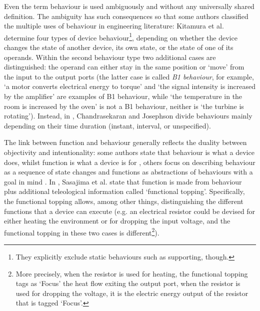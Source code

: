 \documentclass[sw]{iosart2x}
\newcommand{\firstTimeKeyWord}[1]{\textit{#1}}
\newcommand{\quotes}[1]{`#1'}
\newcommand{\TODO}[1]{{\color{red} #1
}}
\newcommand{\TODOinline}[1]{{\color{red} #1
}}
\newcommand{\myComment}[1]{{\unskip \ignorespaces}}
\begin{document}
Even the term behaviour is used ambiguously and without any universally shared definition. 
The ambiguity has such consequences so that some authors classified the multiple uses of behaviour in engineering literature: 
Kitamura et al. \cite{kitamuraOntologyBasedFunctionalKnowledgeModeling2004} determine four types of device behaviour\footnote{They explicitly exclude static behaviours such as supporting, though.}, depending on whether the device changes the state of another device, its own state, or the state of one of its operands. Within the second behaviour type two additional cases are distinguished: the operand can either stay in the same position or `move' from the input to the output ports (the latter case is called \firstTimeKeyWord{B1 behaviour}, for example, \quotes{a motor converts electrical energy to torque} and \quotes{the signal intensity is increased by the amplifier} are examples of B1 behaviour, while \quotes{the temperature in the room is increased by the oven} is not a B1 behaviour, neither is \quotes{the turbine is rotating}).
Instead, in \cite{chandrasekaranFunctionDeviceRepresentation2000}, Chandrasekaran and Josephson divide behaviours mainly depending on their time duration (instant, interval, or unspecified).


The link between function and behaviour generally reflects the duality between objectivity and intentionality: some authors state that behaviour is what a device does, whilst function is what a device is for \cite{kleer_qualitative_1984}, others focus on describing behaviour as a sequence of state changes and functions as abstractions of behaviours with a goal in mind \cite{umedaFunctionBehaviourStructure1990}.  
In \cite{sasajimaFBRLFunctionBehavior1995, sasajimaInvestigationDomainOntology1994}, Sasajima et al. state that function is made from behaviour plus additional teleological information called \quotes{functional topping}.
Specifically, the functional topping allows, among other things, distinguishing the different functions that a device can execute (e.g. an electrical resistor could be devised for either heating the environment or for dropping the input voltage, and the functional topping in these two cases is different\myComment{a heat exchanger could be devised for either heating or cooling depending on the context, and the functional topping in these two cases is different}\footnote{More precisely, when the resistor is used for heating, the functional topping tags as `Focus' the heat flow exiting the output port, when the resistor is used for dropping the voltage, it is the electric energy output of the resistor that is tagged `Focus'.}).
\end{document}
